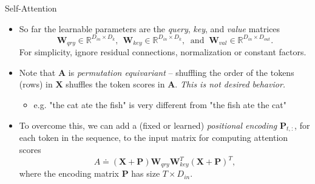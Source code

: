 \documentclass[9pt]{beamer}
\newcommand{\bb}{\mathbb}
\newcommand{\mb}{\bm}
\begin{document}
\begin{frame}{Self-Attention}
\begin{itemize}
\item So far the learnable parameters are the {\em query}, {\em key}, and {\em value} matrices
$$\mb W_{qry} \in \bb R^{D_{in}\times{D_k}}, \ \ 
\mb W_{key} \in \bb R^{D_{in}\times{D_k}},\ \text{ and } \ 
\mb W_{val} \in \bb R^{D_{in}\times{D_{out}}}.$$
For simplicity, ignore residual connections, normalization or constant factors.

\vspace{.15in}
\item Note that $\bm A$ is {\em permutation equivariant} -- shuffling the order of the tokens (rows) in $\bm X$ shuffles the token scores in $\bm A$. {\em This is not desired behavior.}
\begin{itemize}
    \item e.g. "the cat ate the fish" is very different from "the fish ate the cat"
\end{itemize}

\vspace{.1in}
\item To overcome this, we can add a (fixed or learned) {\em positional encoding} $\bm P_{t,:}$, for each token in the sequence, to the input matrix for computing attention scores
\begin{equation}
A \doteq (\mb X + \mb P)\mb W_{qry}\mb W_{key}^T (\mb X + \mb P)^T,
\end{equation}
where the encoding matrix $\bm P$ has size $T\times D_{in}$.
\end{itemize}
\end{frame}
\end{document}
